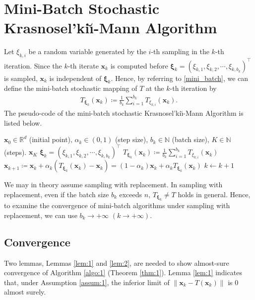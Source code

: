 \documentclass[smallextended,referee,envcountsect,]{svjour3}
\begin{document}
\section{Mini-Batch Stochastic Krasnosel'ki\u\i-Mann Algorithm}
\label{sec:3}
Let $\xi_{k,i}$ be a random variable generated by the $i$-th sampling in the $k$-th iteration. Since the $k$-th iterate $\bm{x}_k$ is computed before $\bm{\xi}_k = (\xi_{k,1}, \xi_{k,2}, \cdots, \xi_{k,b_k})^\top$ is sampled, $\bm{x}_k$ is independent of $\bm{\xi}_k$. Hence, by referring to \eqref{mini_batch}, we can define the mini-batch stochastic mapping of $T$ at the $k$-th iteration by
\begin{align}\label{mini_batch_t}
T_{\bm{\xi}_k} (\bm{x}_k) \coloneqq \frac{1}{b_k} \sum_{i=1}^{b_k} T_{\xi_{k,i}}(\bm{x}_k).
\end{align}
The pseudo-code of the mini-batch stochastic Krasnosel'ki\u\i-Mann Algorithm is listed below. 

\begin{algorithm} 
\caption{Mini-Batch Stochastic Krasnosel'ki\u\i-Mann Algorithm} 
\label{algo:1} 
\begin{algorithmic}[1] 
\REQUIRE
$\bm{x}_{0} \in\mathbb{R}^d$ (initial point), $\alpha_k \in (0,1)$ (step size), $b_k \in \mathbb{N}$ (batch size), $K \in \mathbb{N}$ (steps).
\ENSURE
$\bm{x}_{K}$
\STATE
$\bm{\xi}_k = (\xi_{k,1}, \xi_{k,2}, \cdots, \xi_{k,b_k})^\top$
\STATE
$T_{\bm{\xi}_k}(\bm{x}_k) \coloneqq \frac{1}{b_k} \sum_{i=1}^{b_k} T_{\xi_{k,i}}(\bm{x}_k)$
\STATE
$\bm{x}_{k+1} \coloneqq 
\bm{x}_k + \alpha_k (T_{\bm{\xi}_k}(\bm{x}_k) - \bm{x}_k)
=
(1 - \alpha_k) \bm{x}_k + \alpha_k T_{\bm{\xi}_k}(\bm{x}_k)$
\STATE
$k \gets k + 1$
\ENDFOR
\end{algorithmic}
\end{algorithm}

We may in theory assume sampling with replacement. In sampling with replacement, even if the batch size $b_k$ exceeds $n$, $T_{\bm{\xi}_k} \neq T$ holds in general. Hence, to examine the convergence of mini-batch algorithms under sampling with replacement, we can use $b_k \to + \infty$ $(k \to + \infty)$.

\subsection{Convergence}
\label{sec:3.1}
Two lemmas, Lemmas \ref{lem:1} and \ref{lem:2}, are needed to show almost-sure convergence of Algorithm \ref{algo:1} (Theorem \ref{thm:1}). Lemma \ref{lem:1} indicates that, under Assumption \ref{assum:1}, the inferior limit of $\|\bm{x}_k - T (\bm{x}_k)\|$ is $0$ almost surely. 
\end{document}
